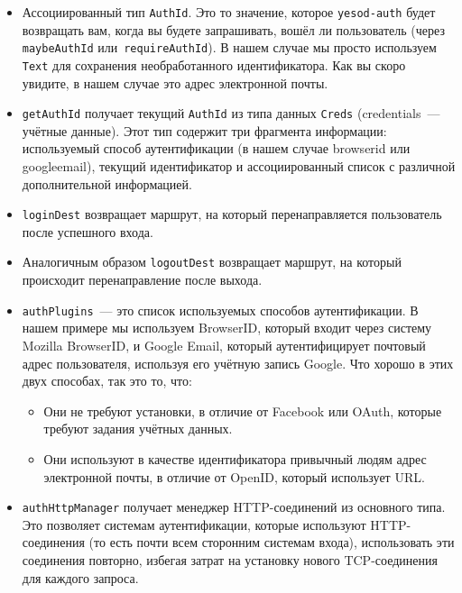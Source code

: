 \begin{itemize}
    \item Ассоциированный тип \lstinline'AuthId'. Это то значение, которое
        \lstinline'yesod-auth' будет возвращать вам, когда вы будете
        запрашивать, вошёл ли пользователь (через \lstinline'maybeAuthId'
        или~\lstinline'requireAuthId'). В нашем случае мы просто используем
        \lstinline'Text' для сохранения необработанного идентификатора. Как вы
        скоро увидите, в нашем случае это адрес электронной почты.

    \item \lstinline'getAuthId' получает текущий \lstinline'AuthId' из типа
        данных \lstinline'Creds' (credentials~--- учётные данные). Этот тип
        содержит три фрагмента информации: используемый способ аутентификации
        (в нашем случае browserid или googleemail), текущий идентификатор и
        ассоциированный список с различной дополнительной информацией.

    \item \lstinline'loginDest' возвращает маршрут, на который перенаправляется
        пользователь после успешного входа.

    \item Аналогичным образом \lstinline'logoutDest' возвращает маршрут, на
        который происходит перенаправление после выхода.

    \item \lstinline'authPlugins'~--- это список используемых способов
        аутентификации. В нашем примере мы используем BrowserID, который входит
        через систему Mozilla BrowserID, и Google Email, который
        аутентифицирует почтовый адрес пользователя, используя его учётную
        запись Google. Что хорошо в этих двух способах, так это то, что:

    \begin{itemize}
        \item Они не требуют установки, в отличие от Facebook или OAuth,
            которые требуют задания учётных данных.

        \item Они используют в качестве идентификатора привычный людям адрес
            электронной почты, в отличие от OpenID, который использует URL.
    \end{itemize}

    \item \lstinline'authHttpManager' получает менеджер HTTP-соединений из
        основного типа. Это позволяет системам аутентификации, которые
        используют HTTP-соединения (то есть почти всем сторонним системам
        входа), использовать эти соединения повторно, избегая затрат на
        установку нового TCP-соединения для каждого запроса.
\end{itemize}


